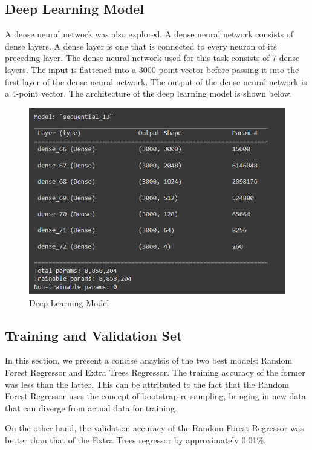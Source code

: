 \documentclass{llncs}
\begin{document}
\subsection{Deep Learning Model}
A dense neural network was also explored. A dense neural network consists of dense layers. A dense layer is one that is connected to every neuron of its preceding layer. The dense neural network used for this task consists of 7 dense layers. The input is flattened into a 3000 point vector before passing it into the first layer of the dense neural network. The output of the dense neural network is a 4-point vector. The architecture of the deep learning model is shown below.
\begin{figure}[h]
    \centering
    \includegraphics[width=\textwidth,height=\textheight,keepaspectratio]{DL_model.png}
    \caption{Deep Learning Model}
    \label{fig:Randomforest}
\end{figure}

\newpage
\subsection{Training and Validation Set}
In this section, we present a concise anaylsis of the two best models: Random Forest Regressor and Extra Trees Regressor. The training accuracy of the former was less than the latter. This can be attributed to the fact that the Random Forest Regressor uses the concept of bootstrap re-sampling, bringing in new data that can diverge from actual data for training. 

On the other hand, the validation accuracy of the Random Forest Regressor was better than that of the Extra Trees regressor by approximately 0.01\%.
\end{document}
